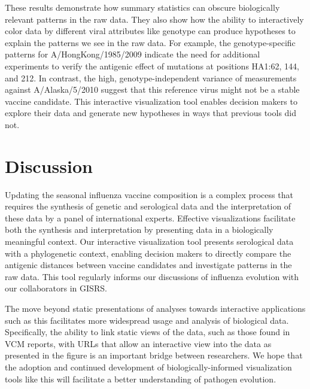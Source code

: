 \documentclass[utf8]{FrontiersinHarvard} %
\begin{document}
These results demonstrate how summary statistics can obscure biologically relevant patterns in the raw data.
They also show how the ability to interactively color data by different viral attributes like genotype can produce hypotheses to explain the patterns we see in the raw data.
For example, the genotype-specific patterns for A/HongKong/1985/2009 indicate the need for additional experiments to verify the antigenic effect of mutations at positions HA1:62, 144, and 212.
In contrast, the high, genotype-independent variance of measurements against A/Alaska/5/2010 suggest that this reference virus might not be a stable vaccine candidate.
This interactive visualization tool enables decision makers to explore their data and generate new hypotheses in ways that previous tools did not.

\section{Discussion}

Updating the seasonal influenza vaccine composition is a complex process that requires the synthesis of genetic and serological data and the interpretation of these data by a panel of international experts.
Effective visualizations facilitate both the synthesis and interpretation by presenting data in a biologically meaningful context.
Our interactive visualization tool presents serological data with a phylogenetic context, enabling decision makers to directly compare the antigenic distances between vaccine candidates and investigate patterns in the raw data.
This tool regularly informs our discussions of influenza evolution with our collaborators in GISRS.

The move beyond static presentations of analyses towards interactive applications such as this facilitates more widespread usage and analysis of biological data.
Specifically, the ability to link static views of the data, such as those found in VCM reports, with URLs that allow an interactive view into the data as presented in the figure is an important bridge between researchers.
We hope that the adoption and continued development of biologically-informed visualization tools like this will facilitate a better understanding of pathogen evolution.
\end{document}
